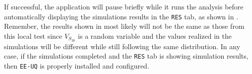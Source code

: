If successful, the application will pause briefly while it runs the
analysis before automatically displaying the simulations results in
the \texttt{RES} tab, as shown
in . Remember, the results shown
in  most likely will not be the same as
those from this local test since $V_{S_{30}}$ is a random variable and
the values realized in the simulations will be different while still
following the same distribution. In any case, if the simulations
completed and the \texttt{RES} tab is showing simulation results, then
\texttt{EE-UQ} is properly installed and configured.
